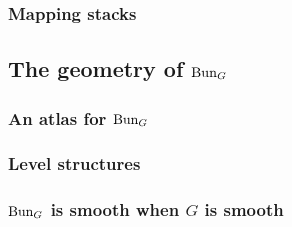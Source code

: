         \subsubsection{Mapping stacks}
    
    \subsection{The geometry of \texorpdfstring{$\mathrm{Bun}_G$}{}}
        \subsubsection{An atlas for \texorpdfstring{$\mathrm{Bun}_G$}{}}
        
        \subsubsection{Level structures}
        
        \subsubsection{\texorpdfstring{$\mathrm{Bun}_G$}{} is smooth when \texorpdfstring{$G$}{} is smooth}